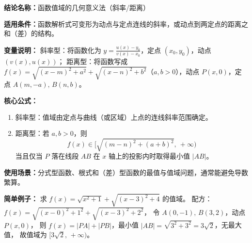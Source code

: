\textbf{结论名称：}函数值域的几何意义法（斜率/距离）

\textbf{适用条件：}函数解析式可变形为动点与定点连线的斜率，或动点到两定点的距离之和（差）的结构。

\textbf{变量说明：}
斜率型：将函数化为 \(y=\frac{u(x)-y_0}{v(x)-x_0}\)，定点 \((x_0,y_0)\)，动点 \((v(x),u(x))\)；
距离型：将函数写成 \(f(x)=\sqrt{(x-m)^2+a^2}+\sqrt{(x-n)^2+b^2}\)（\(a,b>0\)），动点 \(P(x,0)\)，定点 \(A(m,-a),\,B(n,b)\)。

\textbf{核心公式：}
\begin{enumerate}
  \item 斜率型：值域由定点与曲线（或区域）上点的连线斜率范围确定。
  \item 距离型：若 \(a,b>0\)，则
  \[
    \boxed{ f(x) \in \bigl[ \sqrt{(m-n)^2+(a+b)^2},\ +\infty \bigr) }
  \]
  当且仅当 \(P\) 落在线段 \(AB\) 在 \(x\) 轴上的投影内时取得最小值 \(|AB|\)。
\end{enumerate}

\textbf{使用场景：}分式型函数、根式和（差）型函数的最值与值域问题，通常能避免导数繁算。

\textbf{简单例子：}
求 \(f(x)=\sqrt{x^2+1}+\sqrt{(x-3)^2+4}\) 的值域。
配方：\(f(x)=\sqrt{(x-0)^2+1^2}+\sqrt{(x-3)^2+2^2}\)，
令 \(A(0,-1),\,B(3,2)\)，动点 \(P(x,0)\)，
则 \(f(x)=|PA|+|PB|\)，最小值 \(|AB|=\sqrt{3^2+3^2}=3\sqrt{2}\)，无最大值，
故值域为 \([3\sqrt{2},\,+\infty)\)。